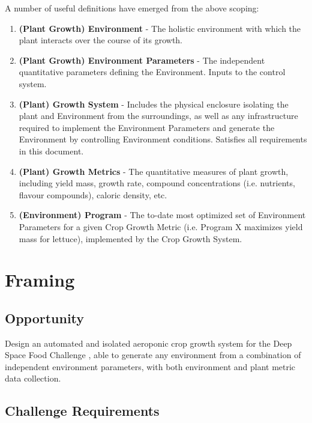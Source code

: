 \documentclass{report}
\begin{document}
A number of useful definitions have emerged from the above scoping:
\begin{enumerate}
\item \textbf{(Plant Growth) Environment} - The holistic environment with which the plant interacts over the course of its growth.
\item \textbf{(Plant Growth) Environment Parameters} - The independent quantitative parameters defining the Environment. Inputs to the control system.
\item \textbf{(Plant) Growth System} - Includes the physical enclosure isolating the plant and Environment from the surroundings, as well as any infrastructure required to implement the Environment Parameters and generate the Environment by controlling Environment conditions. Satisfies all requirements in this document.
\item \textbf{(Plant) Growth Metrics} - The quantitative measures of plant growth, including yield mass, growth rate, compound concentrations (i.e. nutrients, flavour compounds), caloric density, etc.
\item \textbf{(Environment) Program} - The to-date most optimized set of Environment Parameters for a given Crop Growth Metric (i.e. Program X maximizes yield mass for lettuce), implemented by the Crop Growth System.
\end{enumerate}

\newpage
\section{Framing}
\label{sec:framing}

\subsection{Opportunity}
\label{sec:opportunity}

Design an automated and isolated aeroponic crop growth system for the Deep Space Food Challenge \cite{dsfc}, able to generate any environment from a combination of independent environment parameters, with both environment and plant metric data collection.

\subsection{Challenge Requirements}
\label{sec:requirements}
\end{document}
